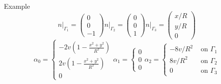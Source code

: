 \documentclass{beamer}
\begin{document}
\begin{frame}{Example}
\[  n\big\rvert_{\Gamma_1} =
  \begin{pmatrix}
    0\\0\\-1
  \end{pmatrix}
  n\big\rvert_{\Gamma_2} =
  \begin{pmatrix}
    0\\0\\1
  \end{pmatrix}
  n\big\rvert_{\Gamma_3} =
  \begin{pmatrix}
    x/R\\y/R\\0
  \end{pmatrix}
  \]
  \[
  \alpha_0 =
  \begin{cases}
    -2v\left(1-\frac{x^2+y^2}{R^2}\right)\\2v\left(1-\frac{x^2+y^2}{R^2}\right)\\0
  \end{cases}
  \alpha_1 =
  \begin{cases}
    0\\0\\0
  \end{cases}
  \alpha_2 =
  \begin{cases}
    -8v/R^2 & \mbox{ on } \Gamma_1\\
    8v/R^2 & \mbox{ on } \Gamma_2\\
    0 & \mbox{ on } \Gamma_3
  \end{cases}
  \]
\end{frame}
\end{document}

